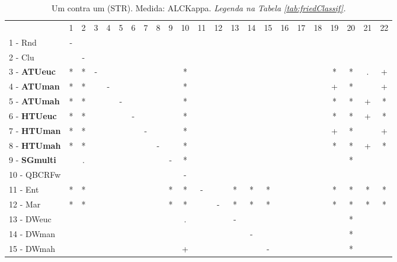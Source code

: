 \begin{table}[h]
\caption{Um contra um (STR). Medida: ALCKappa. \textit{Legenda na Tabela \ref{tab:friedClassif}.}}
\begin{center}\begin{tabular}{lcc|cc|cc|cc|cc|cc|cc|cc|cc|cc|cc}
 			& 1 & 2 & 3 & 4 & 5 & 6 & 7 & 8 & 9 & 10 & 11 & 12 & 13 & 14 & 15 & 16 & 17 & 18 & 19 & 20 & 21 & 22\\
1 - Rnd  	& - &   &   &   &   &   &   &   &   &   &   &   &   &   &   &   &   &   &   &   &   &   \\
2 - Clu  	&   & - &   &   &   &   &   &   &   &   &   &   &   &   &   &   &   &   &   &   &   &   \\ \hline
3 - \textbf{ATUeuc}	& * & * & - &   &   &   &   &   &   & * &   &   &   &   &   &   &   &   & * & * & . & + \\
4 - \textbf{ATUman}	& * & * &   & - &   &   &   &   &   & * &   &   &   &   &   &   &   &   & + & * &   & + \\ \hline
5 - \textbf{ATUmah}	& * & * &   &   & - &   &   &   &   & * &   &   &   &   &   &   &   &   & * & * & + & * \\
6 - \textbf{HTUeuc}	& * & * &   &   &   & - &   &   &   & * &   &   &   &   &   &   &   &   & * & * & + & * \\ \hline
7 - \textbf{HTUman}	& * & * &   &   &   &   & - &   &   & * &   &   &   &   &   &   &   &   & + & * &   & + \\
8 - \textbf{HTUmah}	& * & * &   &   &   &   &   & - &   & * &   &   &   &   &   &   &   &   & * & * & + & * \\ \hline
9 - \textbf{SGmulti}	&   & . &   &   &   &   &   &   & - & * &   &   &   &   &   &   &   &   &   & * &   &   \\
10 - QBCRFw	&   &   &   &   &   &   &   &   &   & - &   &   &   &   &   &   &   &   &   &   &   &   \\ \hline
11 - Ent  	& * & * &   &   &   &   &   &   & * & * & - &   & * & * & * &   &   &   & * & * & * & * \\
12 - Mar  	& * & * &   &   &   &   &   &   & * & * &   & - & * & * & * &   &   &   & * & * & * & * \\ \hline
13 - DWeuc	&   &   &   &   &   &   &   &   &   & . &   &   & - &   &   &   &   &   &   & * &   &   \\
14 - DWman	&   &   &   &   &   &   &   &   &   &   &   &   &   & - &   &   &   &   &   & * &   &   \\ \hline
15 - DWmah	&   &   &   &   &   &   &   &   &   & + &   &   &   &   & - &   &   &   &   & * &   &   \\

\end{tabular}
\end{center}
\end{table}
